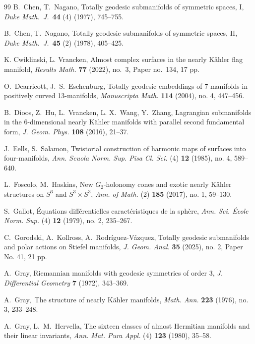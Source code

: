 \documentclass[11pt,a4paper,final]{amsart}
\theoremstyle{definition}
\begin{document}
\begin{thebibliography}{99}
	B.~Chen, T.~Nagano, Totally geodesic submanifolds of symmetric spaces, I, \emph{Duke Math.\  J.}~\textbf{44} (4) (1977), 745--755.
		
	B.~Chen, T.~Nagano, Totally geodesic submanifolds of symmetric spaces, II, \emph{Duke Math.\ J.}~\textbf{45} (2) (1978), 405--425.
	
	K. Cwiklinski, L. Vrancken, Almost complex surfaces in the nearly Kähler flag manifold, \textit{Results Math.} \textbf{77} (2022), no.~3, Paper no.~134, 17 pp.
		
	O.~Dearricott,  J.~S.~Eschenburg,  Totally geodesic embeddings of 7-manifolds in positively curved 13-manifolds, \textit{Manuscripta Math.} \textbf{114} (2004), no. 4, 447--456.

	B.~Dioos, Z.~Hu, L.~Vrancken, L. X.~Wang,  Y.~Zhang, Lagrangian submanifolds in the 6-dimensional nearly Kähler manifolds with parallel second fundamental form, \textit{J. Geom. Phys.} \textbf{108} (2016), 21--37.
		
	J.~Eells, S.~Salamon, Twistorial construction of harmonic maps of surfaces into four-manifolds, \textit{Ann. Scuola Norm. Sup. Pisa Cl. Sci.} (4) \textbf{12} (1985), no. 4, 589--640.

	L.~Foscolo,  M.~Haskins,  New $G_{2}$-holonomy cones and exotic nearly Kähler structures on $S^{6}$ and $S^{3}\times S^{3}$, \textit{Ann. of Math.} (2) \textbf{185} (2017), no. 1, 59--130. 

	S.~Gallot,  Équations différentielles caractéristiques de la sphère, \textit{Ann. Sci. École Norm. Sup.} (4) \textbf{12} (1979), no. 2, 235--267.
		
    C.~Gorodski, A.~Kollross, A.~Rodr\'{i}guez-V\'{a}zquez, Totally geodesic submanifolds and polar actions on Stiefel manifolds, \textit{J. Geom. Anal.} \textbf{35} (2025), no. 2, Paper No. 41, 21 pp.

	A.~Gray, Riemannian manifolds with geodesic symmetries of order 3, \textit{J. Differential Geometry} \textbf{7} (1972), 343--369.

	A.~Gray,~The structure of nearly Kähler manifolds, \textit{Math. Ann.} \textbf{223} (1976), no. 3, 233--248.

	A.~Gray,  L.~M.~Hervella, The sixteen classes of almost Hermitian manifolds and their linear invariants, \textit{Ann. Mat. Pura Appl.} (4) \textbf{123} (1980), 35--58.
	

\end{thebibliography}
\end{document}

